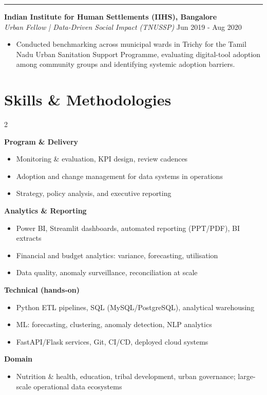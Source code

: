 \documentclass[a4paper,10pt]{article}
\begin{document}
\vspace{1pt}

\noindent\rule{\textwidth}{0.15pt}
{\large\textbf{Indian Institute for Human Settlements (IIHS), Bangalore}} \\
\textit{Urban Fellow | Data-Driven Social Impact (TNUSSP)} \hfill {\datefont\small Jun 2019 - Aug 2020}
\begin{itemize}
\item Conducted benchmarking across municipal wards in Trichy for the Tamil Nadu Urban Sanitation Support Programme, evaluating digital-tool adoption among community groups and identifying systemic adoption barriers.
\end{itemize}

\section*{Skills \& Methodologies}

\begin{multicols}{2}
\raggedright

\textbf{Program \& Delivery}
\begin{itemize}
\item Monitoring \& evaluation, KPI design, review cadences
\item Adoption and change management for data systems in operations
\item Strategy, policy analysis, and executive reporting
\end{itemize}

\textbf{Analytics \& Reporting}
\begin{itemize}
\item Power BI, Streamlit dashboards, automated reporting (PPT/PDF), BI extracts
\item Financial and budget analytics: variance, forecasting, utilisation
\item Data quality, anomaly surveillance, reconciliation at scale
\end{itemize}

\columnbreak

\textbf{Technical (hands-on)}
\begin{itemize}
\item Python ETL pipelines, SQL (MySQL/PostgreSQL), analytical warehousing
\item ML: forecasting, clustering, anomaly detection, NLP analytics
\item FastAPI/Flask services, Git, CI/CD, deployed cloud systems
\end{itemize}

\textbf{Domain}
\begin{itemize}
\item Nutrition \& health, education, tribal development, urban governance; large-scale operational data ecosystems
\end{itemize}

\end{multicols}
\end{document}
